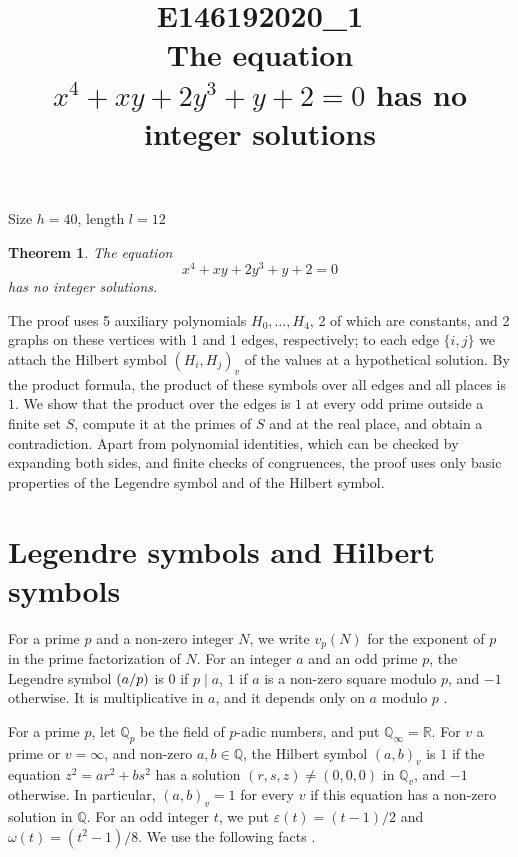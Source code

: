 \documentclass[11pt]{article}
\title{\textbf{E146192020\_1}\\[4pt] {\Large The equation $x^{4}+xy+2y^{3}+y+2=0$ has no integer solutions}}
\author{}
\date{}
\newtheorem{theorem}{Theorem}
\newcommand{\Q}{\mathbb{Q}}
\newcommand{\leg}[2]{\mathchoice{\biggl(\dfrac{#1}{#2}\biggr)}{(#1/#2)}{(#1/#2)}{(#1/#2)}}
\begin{document}
\maketitle
\vspace{-8ex}
\begin{center}
Size $h=40$, length $l=12$
\end{center}

\begin{theorem}\label{thm:main}
The equation
\begin{equation}\label{eq:main}
x^{4}+xy+2y^{3}+y+2=0
\end{equation}
has no integer solutions.
\end{theorem}

The proof uses 5 auxiliary polynomials $H_0,\dots,H_{4}$, 2 of which are constants, and 2 graphs on these vertices with 1 and 1 edges, respectively; to each edge $\{i,j\}$ we attach the Hilbert symbol $(H_i,H_j)_v$ of the values at a hypothetical solution. By the product formula, the product of these symbols over all edges and all places is $1$. We show that the product over the edges is $1$ at every odd prime outside a finite set $S$, compute it at the primes of $S$ and at the real place, and obtain a contradiction. Apart from polynomial identities, which can be checked by expanding both sides, and finite checks of congruences, the proof uses only basic properties of the Legendre symbol and of the Hilbert symbol.

\section{Legendre symbols and Hilbert symbols}

For a prime $p$ and a non-zero integer $N$, we write $v_p(N)$ for the exponent of $p$ in the prime factorization of $N$. For an integer $a$ and an odd prime $p$, the Legendre symbol $\leg{a}{p}$ is $0$ if $p\mid a$, $1$ if $a$ is a non-zero square modulo $p$, and $-1$ otherwise. It is multiplicative in $a$, and it depends only on $a$ modulo $p$ \cite[Chapter~5]{IR}.

For a prime $p$, let $\Q_p$ be the field of $p$-adic numbers, and put $\Q_\infty=\mathbb R$. For $v$ a prime or $v=\infty$, and non-zero $a,b\in\Q$, the Hilbert symbol $(a,b)_v$ is $1$ if the equation $z^2=ar^2+bs^2$ has a solution $(r,s,z)\neq(0,0,0)$ in $\Q_v$, and $-1$ otherwise. In particular, $(a,b)_v=1$ for every $v$ if this equation has a non-zero solution in $\Q$. For an odd integer $t$, we put $\varepsilon(t)=(t-1)/2$ and $\omega(t)=(t^2-1)/8$. We use the following facts \cite[Chapter~III, Proposition~2 and Theorems~1 and~3]{Se}.
\end{document}
